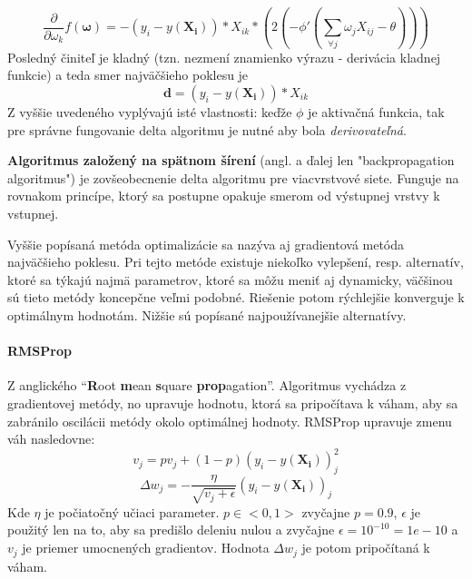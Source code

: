 \begin{equation}
    \frac{\partial}{\partial \omega_k}f(\pmb{\omega})=-(y_i-y(\mathbf{X_i}))*X_{ik}*(2(-\phi'(\sum_{\forall j}{\omega_j X_{ij}-\theta})))
\end{equation}
Posledný činiteľ je kladný (tzn. nezmení znamienko výrazu - derivácia kladnej funkcie) a teda smer najväčšieho poklesu
je
\begin{equation}
    \pmb{d}=(y_i-y(\mathbf{X_i}))*X_{ik}
\end{equation}
Z vyššie uvedeného vyplývajú isté vlastnosti: keďže $\phi$ je aktivačná funkcia, tak pre správne fungovanie delta
algoritmu je nutné aby bola \emph{derivovateľná}.

\textbf{Algoritmus založený na spätnom šírení} (angl. a ďalej len "backpropagation algoritmus") je zovšeobecnenie delta
algoritmu pre viacvrstvové siete.
Funguje na rovnakom princípe, ktorý sa postupne opakuje smerom od výstupnej vrstvy k vstupnej.

Vyššie popísaná metóda optimalizácie sa nazýva aj gradientová metóda najväčšieho poklesu.
Pri tejto metóde existuje niekoľko vylepšení, resp. alternatív, ktoré sa týkajú najmä parametrov, ktoré sa môžu meniť
aj dynamicky, väčšinou sú tieto metódy koncepčne veľmi podobné.
Riešenie potom rýchlejšie konverguje k optimálnym hodnotám.
Nižšie sú popísané najpoužívanejšie alternatívy.
\paragraph{RMSProp}\cite{algo_ann_optimizer_rmsprop}
Z anglického \enquote{\textbf{R}oot \textbf{m}ean \textbf{s}quare \textbf{prop}agation}.
Algoritmus vychádza z gradientovej metódy, no upravuje hodnotu, ktorá sa pripočítava k váham, aby sa zabránilo oscilácii
metódy okolo optimálnej hodnoty.
RMSProp upravuje zmenu váh nasledovne:
\begin{equation}
    v_j=pv_j+(1-p)(y_i-y(\mathbf{X_i}))_j^2
\end{equation}
\begin{equation}
    \Delta{w_j}=-\frac{\eta}{\sqrt{v_j+\epsilon}}(y_i-y(\mathbf{X_i}))_j
\end{equation}
Kde $\eta$ je počiatočný učiaci parameter.
$p \in <0,1>$ zvyčajne $p=0.9$, $\epsilon$ je použitý len na to, aby sa predišlo deleniu nulou a zvyčajne
$\epsilon = 10^{-10} = 1e-10$ a $v_j$ je priemer umocnených gradientov.
Hodnota $\Delta{w_j}$ je potom pripočítaná k váham.
